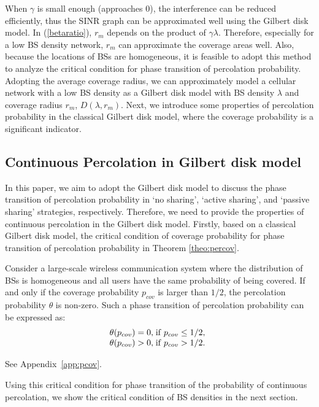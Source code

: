 \documentclass[final]{IEEEtran}
\begin{document}
\indent When $\gamma$ is small enough (approaches 0), the interference can be reduced efficiently, thus the SINR graph can be approximated well using the Gilbert disk model. In (\ref{betaratio}), $r_m$ depends on the product of $\gamma\lambda$. Therefore, especially for a low BS density network, $r_m$ can approximate the coverage areas well. Also, because the locations of BSs are homogeneous, it is feasible to adopt this method to analyze the critical condition for phase transition of percolation probability. \\
\indent Adopting the average coverage radius, we can approximately model a cellular network with a low BS density as a Gilbert disk model with BS density $\lambda$ and coverage radius $r_m$, \ie $D(\lambda,r_m)$. Next, we introduce some properties of percolation probability in the classical Gilbert disk model, where the coverage probability is a significant indicator.
\subsection{Continuous Percolation in Gilbert disk model}
\indent In this paper, we aim to adopt the Gilbert disk model to discuss the phase transition of percolation probability in `no sharing', `active sharing', and `passive sharing' strategies, respectively. Therefore, we need to provide the properties of continuous percolation in the Gilbert disk model. Firstly, based on a classical Gilbert disk model, the critical condition of coverage probability for phase transition of percolation probability in Theorem \ref{theo:percov}.
\begin{theorem}\label{theo:percov}
    Consider a large-scale wireless communication system where the distribution of BSs is homogeneous and all users have the same probability of being covered. If and only if the coverage probability $p_{cov}$ is larger than $1/2$, the percolation probability $\theta$ is non-zero. Such a phase transition of percolation probability can be expressed as: 
\begin{equation}\left.
    \begin{array}{@{}r@{}l}
    \theta(p_{cov})=0, &\;{\rm if}\;p_{cov}\leq1/2,\\
    \theta(p_{cov})>0, &\;{\rm if}\;p_{cov}>1/2.
    \end{array}\right.
    \label{percov}
\end{equation}
\end{theorem}
\begin{IEEEproof}
    See Appendix~\ref{app:pcov}.
\end{IEEEproof}
\indent Using this critical condition for phase transition of the probability of continuous percolation, we show the critical condition of BS densities in the next section.
\end{document}
